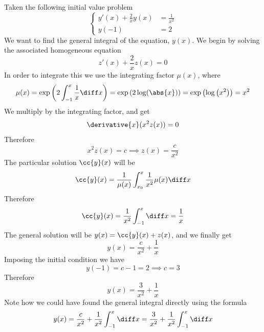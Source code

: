 \documentclass[../mmf.tex]{subfiles}
\begin{document}
\begin{eg}
	Taken the following initial value problem
	\begin{equation*}
		\left\{ \begin{aligned}
				y'(x)+\frac{2}{x}y(x)&=\frac{1}{x^2}\\
				y(-1)&=2
		\end{aligned}\right.
	\end{equation*}
	We want to find the general integral of the equation, $y(x)$. We begin by solving the associated homogeneous equation
	\begin{equation*}
		z'(x)+\frac{2}{x}z(x)=0
	\end{equation*}
	In order to integrate this we use the integrating factor $\mu(x)$, where
	\begin{equation*}
		\mu(x)=\exp\left( 2\int_{-1}^{x}\frac{1}{x}\diff x \right)=\exp\left( 2\log(\abs{x}) \right)=\exp\left( \log\left( x^2 \right) \right)=x^2
	\end{equation*}
	We multiply by the integrating factor, and get
	\begin{equation*}
		\derivative{x}(x^2z(x))=0
	\end{equation*}
	Therefore
	\begin{equation*}
		x^2z(x)=c\implies{} z(x)=\frac{c}{x^2}
	\end{equation*}
	The particular solution $\cc{y}(x)$ will be
	\begin{equation*}
		\cc{y}(x)=\frac{1}{\mu(x)}\int_{x_0}^{x}\frac{1}{x^2}\mu(x)\diff x
	\end{equation*}
	Therefore
	\begin{equation*}
		\cc{y}(x)=\frac{1}{x^2}\int_{-1}^{x}\diff x=\frac{1}{x}
	\end{equation*}
	The general solution will be $y(x)=\cc{y}(x)+z(x)$, and we finally get
	\begin{equation*}
		y(x)=\frac{c}{x^2}+\frac{1}{x}
	\end{equation*}
	Imposing the initial condition we have
	\begin{equation*}
		y(-1)=c-1=2\implies{} c=3
	\end{equation*}
	Therefore
	\begin{equation*}
		y(x)=\frac{3}{x^2}+\frac{1}{x}
	\end{equation*}
	Note how we could have found the general integral directly using the formula
	\begin{equation*}
		y(x)=\frac{c}{x^2}+\frac{1}{x^2}\int_{-1}^{x}\diff x=\frac{3}{x^2}+\frac{1}{x^2}\int_{-1}^{x}\diff x
	\end{equation*}
\end{eg}
\end{document}
